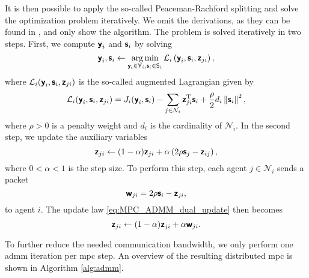 It is then possible to apply the so-called Peaceman-Rachford splitting \cite{dacis_splitting_2016} and solve the optimization problem iteratively.
We omit the derivations, as they can be found in \cite{bastianello_asynchronous_2021}, and only show the algorithm.
The problem is solved iteratively in two steps.
First, we compute $\boldsymbol{\mathsf{y}}_i$ and $\boldsymbol{\mathsf{s}}_i$ by solving
\begin{equation}
    \boldsymbol{\mathsf{y}}_i, \boldsymbol{\mathsf{s}}_i
    \leftarrow
    \operatorname*{arg\,min}_{\boldsymbol{\mathsf{y}}_i \in \mathsf{Y}_i, \boldsymbol{\mathsf{s}}_i \in \mathsf{S}_i}
    \mathcal{L}_i
    \left(
        \boldsymbol{\mathsf{y}}_i, \boldsymbol{\mathsf{s}}_i, \boldsymbol{\mathsf{z}}_{ji}
    \right), \label{eq:MPC_ADMM_primal_update}
\end{equation}
where $\mathcal{L}_i(\boldsymbol{\mathsf{y}}_i, \boldsymbol{\mathsf{s}}_i, \boldsymbol{\mathsf{z}}_{ji})$ is the so-called augmented Lagrangian given by
\begin{equation}
    \mathcal{L}_i(\boldsymbol{\mathsf{y}}_i, \boldsymbol{\mathsf{s}}_i, \boldsymbol{\mathsf{z}}_{ji}) = J_i(\boldsymbol{\mathsf{y}}_i, \boldsymbol{\mathsf{s}}_i) - \sum_{j \in \mathcal{N}_i} \boldsymbol{\mathsf{z}}_{ji}^{\mathrm{T}}\boldsymbol{\mathsf{s}}_i + \frac{\rho}{2}d_i\left\|\boldsymbol{\mathsf{s}}_i\right\|^2,
\end{equation}
where $\rho > 0$ is a penalty weight and $d_i$ is the cardinality of $\mathcal{N}_i$.
In the second step, we update the auxiliary variables
\begin{equation}
    \boldsymbol{\mathsf{z}}_{ji} \leftarrow (1 - \alpha) \boldsymbol{\mathsf{z}}_{ji} + \alpha \left(2\rho\boldsymbol{\mathsf{s}}_j - \boldsymbol{\mathsf{z}}_{ij}\right), \label{eq:MPC_ADMM_dual_update}
\end{equation}
where $0 < \alpha < 1$ is the step size. To perform this step, each agent $j \in \mathcal{N}_i$ sends a packet
\begin{equation}
    \boldsymbol{\mathsf{w}}_{ji} = 2\rho\boldsymbol{\mathsf{s}}_i - \boldsymbol{\mathsf{z}}_{ji}, \label{eq:MPC_ADMM_packet}
\end{equation}
to agent $i$. The update law \eqref{eq:MPC_ADMM_dual_update} then becomes
\begin{equation}
    \boldsymbol{\mathsf{z}}_{ji} \leftarrow (1 - \alpha) \boldsymbol{\mathsf{z}}_{ji} + \alpha \boldsymbol{\mathsf{w}}_{ji}. \label{eq:MPC_ADMM_dual_update_packet}
\end{equation} 

To further reduce the needed communication bandwidth, we only perform one \gls{admm} iteration per \gls{mpc} step. An overview of the resulting distributed \gls{mpc} is shown in Algorithm \ref{alg:admm}.

